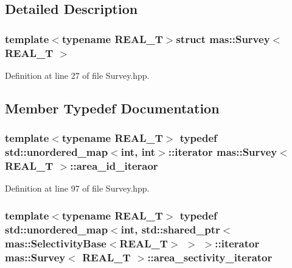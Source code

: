 \subsection{Detailed Description}
\subsubsection*{template$<$typename R\-E\-A\-L\-\_\-\-T$>$struct mas\-::\-Survey$<$ R\-E\-A\-L\-\_\-\-T $>$}



Definition at line 27 of file Survey.\-hpp.



\subsection{Member Typedef Documentation}
\hypertarget{structmas_1_1_survey_a08455055f86587e069b3ea5266ef0822}{
\subsubsection[{area\-\_\-id\-\_\-iteraor}]{\setlength{\rightskip}{0pt plus 5cm}template$<$typename R\-E\-A\-L\-\_\-\-T$>$ typedef std\-::unordered\-\_\-map$<$int, int$>$\-::iterator {\bf mas\-::\-Survey}$<$ R\-E\-A\-L\-\_\-\-T $>$\-::{\bf area\-\_\-id\-\_\-iteraor}}}\label{structmas_1_1_survey_a08455055f86587e069b3ea5266ef0822}


Definition at line 97 of file Survey.\-hpp.

\hypertarget{structmas_1_1_survey_abfde314e73f8c92d58d75373fc805ee3}{
\subsubsection[{area\-\_\-sectivity\-\_\-iterator}]{\setlength{\rightskip}{0pt plus 5cm}template$<$typename R\-E\-A\-L\-\_\-\-T$>$ typedef std\-::unordered\-\_\-map$<$int, std\-::shared\-\_\-ptr$<${\bf mas\-::\-Selectivity\-Base}$<$R\-E\-A\-L\-\_\-\-T$>$ $>$ $>$\-::iterator {\bf mas\-::\-Survey}$<$ R\-E\-A\-L\-\_\-\-T $>$\-::{\bf area\-\_\-sectivity\-\_\-iterator}}}\label{structmas_1_1_survey_abfde314e73f8c92d58d75373fc805ee3}


